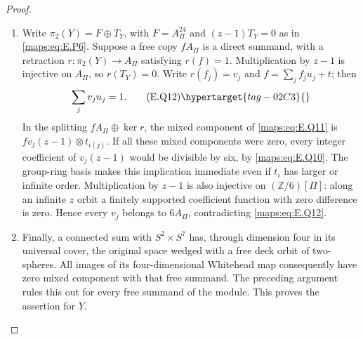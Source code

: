 \begin{proof}
\begin{enumerate}[label={$\langle1\rangle$\arabic*.},leftmargin=*]
\item Write $\pi_2(Y)=F\oplus T_Y$, with $F=A_\Pi^{24}$ and
$(z-1)T_Y=0$ as in \eqref{maps:eq:E.P6}.  Suppose a free copy $fA_\Pi$
is a direct summand, with a retraction $r:\pi_2(Y)\to A_\Pi$
satisfying $r(f)=1$.  Multiplication by $z-1$ is injective
on $A_\Pi$, so $r(T_Y)=0$.  Write $r(f_j)=v_j$ and
$f=\sum_j f_j u_j+t$; then
\[
                         \sum_j v_j u_j=1.
 \tag{E.Q12}\hypertarget{tag-02C3}{}\label{maps:eq:E.Q12}
\]
In the splitting $fA_\Pi\oplus\ker r$, the mixed component
of \eqref{maps:eq:E.Q11} is $f v_j(z-1)\otimes t_{i(j)}$.  If all these
mixed components were zero, every integer coefficient of
$v_j(z-1)$ would be divisible by six, by \eqref{maps:eq:E.Q10}.  The
group-ring basis makes this implication immediate even if
$t_i$ has larger or infinite order.  Multiplication by
$z-1$ is also injective on $(\mathbb Z/6)[\Pi]$: along an
infinite $z$ orbit a finitely supported coefficient function
with zero difference is zero.  Hence every $v_j$ belongs
to $6A_\Pi$, contradicting \eqref{maps:eq:E.Q12}.

\item Finally, a connected sum with $S^2\times S^7$ has, through
dimension four in its universal cover, the original space
wedged with a free deck orbit of two-spheres.  All images
of its four-dimensional Whitehead map consequently have
zero mixed component with that free summand.  The preceding
argument rules this out for every free summand of the module.  This proves the assertion for $Y$.
\end{enumerate}
\end{proof}




